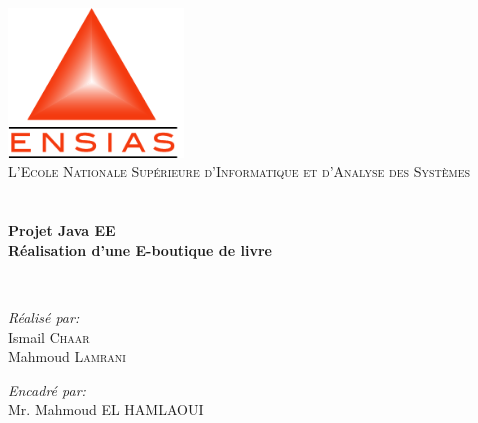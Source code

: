 \begin{titlepage}
\begin{center}

\includegraphics[width=0.35\textwidth]{./logo}~\\[1cm]

\textsc{\LARGE L'Ecole Nationale Supérieure d'Informatique et d'Analyse des Systèmes}\\[1.5cm]

\textsc{\Large }\\[0.5cm]

\HRule \\[0.4cm]

{\huge \bfseries Projet Java EE\\
Réalisation d'une E-boutique de livre \\[0.4cm] }

\HRule \\[1.5cm]

\begin{minipage}{0.4\textwidth}
\begin{flushleft} \large
\emph{Réalisé par:}\\
Ismail \textsc{Chaar}\\
Mahmoud \textsc{Lamrani}\\

\end{flushleft}
\end{minipage}
\begin{minipage}{0.4\textwidth}
\begin{flushright} \large
\emph{Encadré par:} \\
Mr. Mahmoud \textsc{EL HAMLAOUI}\\

\end{flushright}
\end{minipage}

\vfill



\end{center}
\end{titlepage}